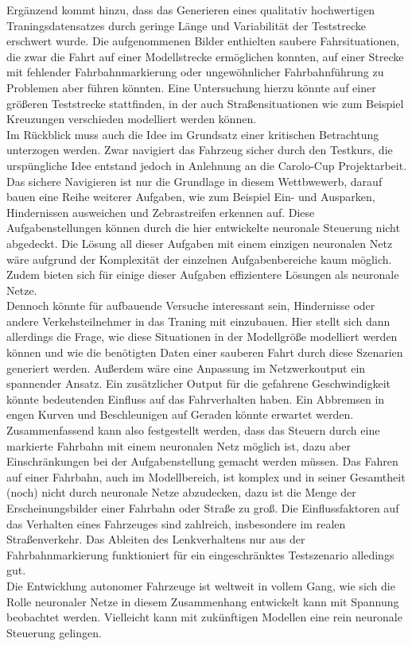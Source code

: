 Ergänzend kommt hinzu, dass das Generieren eines qualitativ hochwertigen Traningsdatensatzes durch geringe Länge und Variabilität der Teststrecke erschwert wurde. Die aufgenommenen Bilder enthielten saubere Fahrsituationen, die zwar die Fahrt auf einer Modellstrecke ermöglichen konnten, auf einer Strecke mit fehlender Fahrbahnmarkierung oder ungewöhnlicher Fahrbahnführung zu Problemen aber führen könnten. Eine Untersuchung hierzu könnte auf einer größeren Teststrecke stattfinden, in der auch Straßensituationen wie zum Beispiel Kreuzungen verschieden modelliert werden können.\\ 
Im Rückblick muss auch die Idee im Grundsatz einer kritischen Betrachtung unterzogen werden. Zwar navigiert das Fahrzeug sicher durch den Testkurs, die urspüngliche Idee entstand jedoch in Anlehnung an die Carolo-Cup Projektarbeit. Das sichere Navigieren ist nur die Grundlage in diesem Wettbwewerb, darauf bauen eine Reihe weiterer Aufgaben, wie zum Beispiel Ein- und Ausparken, Hindernissen ausweichen und Zebrastreifen erkennen auf. Diese Aufgabenstellungen können durch die hier entwickelte neuronale Steuerung nicht abgedeckt. Die Lösung all dieser Aufgaben mit einem einzigen neuronalen Netz wäre aufgrund der Komplexität der einzelnen Aufgabenbereiche kaum möglich. Zudem bieten sich für einige dieser Aufgaben effizientere Lösungen als neuronale Netze.\\
Dennoch könnte für aufbauende Versuche interessant sein, Hindernisse oder andere Verkehsteilnehmer in das Traning mit einzubauen. Hier stellt sich dann allerdings die Frage, wie diese Situationen in der Modellgröße modelliert werden können und wie die benötigten Daten einer sauberen Fahrt durch diese Szenarien generiert werden. Außerdem wäre eine Anpassung im Netzwerkoutput ein spannender Ansatz. Ein zusätzlicher Output für die gefahrene Geschwindigkeit könnte bedeutenden Einfluss auf das Fahrverhalten haben. Ein Abbremsen in engen Kurven und Beschleunigen auf Geraden könnte erwartet werden.\\
Zusammenfassend kann also festgestellt werden, dass das Steuern durch eine markierte Fahrbahn mit einem neuronalen Netz möglich ist, dazu aber Einschränkungen bei der Aufgabenstellung gemacht werden müssen. Das Fahren auf einer Fahrbahn, auch im Modellbereich, ist komplex und in seiner Gesamtheit (noch) nicht durch neuronale Netze abzudecken, dazu ist die Menge der Erscheinungsbilder einer Fahrbahn oder Straße zu groß. Die Einflussfaktoren auf das Verhalten eines Fahrzeuges sind zahlreich, insbesondere im realen Straßenverkehr. Das Ableiten des Lenkverhaltens nur aus der Fahrbahnmarkierung funktioniert für ein eingeschränktes Testszenario alledings gut.\\
Die Entwicklung autonomer Fahrzeuge ist weltweit in vollem Gang, wie sich die Rolle neuronaler Netze in diesem Zusammenhang entwickelt kann mit Spannung beobachtet werden. Vielleicht kann mit zukünftigen Modellen eine rein neuronale Steuerung gelingen.

